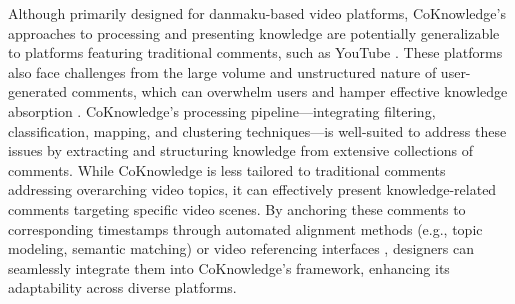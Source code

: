 Although primarily designed for danmaku-based video platforms, CoKnowledge’s approaches to processing and presenting knowledge are potentially generalizable to platforms featuring traditional comments, such as YouTube \cite{youtube}. These platforms also face challenges from the large volume and unstructured nature of user-generated comments, which can overwhelm users and hamper effective knowledge absorption \cite{liu2022planhelper, liu2023coargue}. CoKnowledge’s processing pipeline—integrating filtering, classification, mapping, and clustering techniques—is well-suited to address these issues by extracting and structuring knowledge from extensive collections of comments.
While CoKnowledge is less tailored to traditional comments addressing overarching video topics, it can effectively present knowledge-related comments targeting specific video scenes. By anchoring these comments to corresponding timestamps through automated alignment methods (e.g., topic modeling, semantic matching) or video referencing interfaces \cite{yarmand2019can, kitayama2008organizing}, designers can seamlessly integrate them into CoKnowledge’s framework, enhancing its adaptability across diverse platforms.
